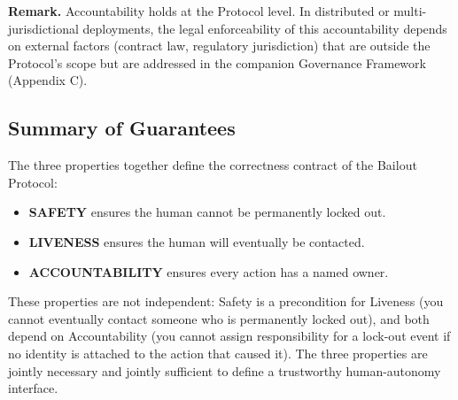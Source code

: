 \textbf{Remark.} Accountability holds at the Protocol level. In distributed or multi-jurisdictional deployments, the legal enforceability of this accountability depends on external factors (contract law, regulatory jurisdiction) that are outside the Protocol's scope but are addressed in the companion Governance Framework (Appendix C).

\subsection{Summary of Guarantees}

The three properties together define the correctness contract of the Bailout Protocol:

\begin{itemize}
    \itemsep0pt
    \item \textbf{SAFETY} ensures the human cannot be permanently locked out.
    \item \textbf{LIVENESS} ensures the human will eventually be contacted.
    \item \textbf{ACCOUNTABILITY} ensures every action has a named owner.
\end{itemize}

These properties are not independent: Safety is a precondition for Liveness (you cannot eventually contact someone who is permanently locked out), and both depend on Accountability (you cannot assign responsibility for a lock-out event if no identity is attached to the action that caused it). The three properties are jointly necessary and jointly sufficient to define a trustworthy human-autonomy interface.
